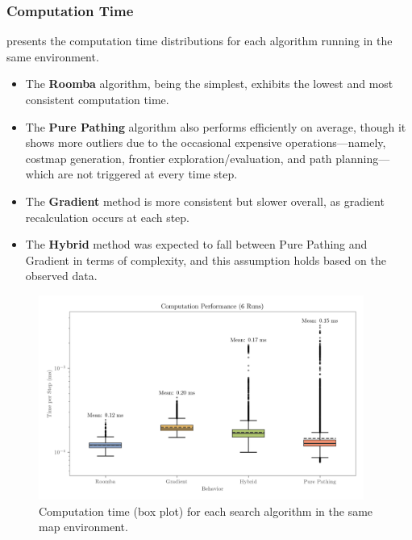 \subsubsection{Computation Time}
 presents the computation time distributions for each algorithm running in the same environment.

\begin{itemize}
  \item The \textbf{Roomba} algorithm, being the simplest, exhibits the lowest and most consistent computation time.
\item The \textbf{Pure Pathing} algorithm also performs efficiently on average, though it shows more outliers due to the occasional expensive operations—namely, costmap generation, frontier exploration/evaluation, and path planning—which are not triggered at every time step.
\item The \textbf{Gradient} method is more consistent but slower overall, as gradient recalculation occurs at each step.
\item The \textbf{Hybrid} method was expected to fall between Pure Pathing and Gradient in terms of complexity, and this assumption holds based on the observed data.
\end{itemize}

\begin{figure}[H]
    \begin{center}
        \includegraphics[width=0.95\textwidth]{./figures/plots/computation-performance-(6-runs).png}
    \end{center}
    \caption{Computation time (box plot) for each search algorithm in the same map environment.}
    \label{fig:computation-performance}
\end{figure}

